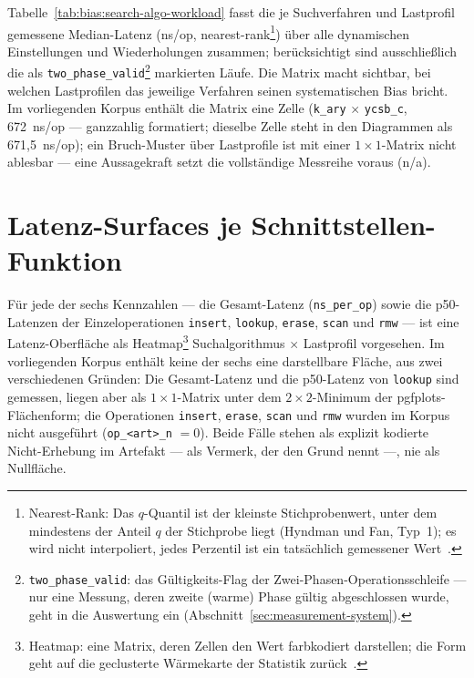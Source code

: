 Tabelle~\ref{tab:bias:search-algo-workload} fasst die je Suchverfahren und Lastprofil gemessene
Median-Latenz (ns/op, nearest-rank\footnote{Nearest-Rank: Das $q$-Quantil ist der kleinste
Stichprobenwert, unter dem mindestens der Anteil $q$ der Stichprobe liegt (Hyndman und Fan,
Typ~1); es wird nicht interpoliert, jedes Perzentil ist ein tatsächlich gemessener
Wert~\cite{hyndman1996quantiles}.}) über alle dynamischen Einstellungen und Wiederholungen
zusammen; berücksichtigt sind ausschließlich die als \texttt{two\_phase\_valid}\footnote{%
\texttt{two\_phase\_valid}: das Gültigkeits-Flag der Zwei-Phasen-Operationsschleife --- nur eine
Messung, deren zweite (warme) Phase gültig abgeschlossen wurde, geht in die Auswertung ein
(Abschnitt~\ref{sec:measurement-system}).} markierten Läufe. Die Matrix macht sichtbar, bei welchen
Lastprofilen das jeweilige Verfahren seinen systematischen Bias bricht. Im vorliegenden Korpus enthält
die Matrix eine Zelle (\texttt{k\_ary} $\times$ \texttt{ycsb\_c}, 672~ns/op --- ganzzahlig
formatiert; dieselbe Zelle steht in den Diagrammen als 671,5~ns/op); ein Bruch-Muster über
Lastprofile ist mit einer $1{\times}1$-Matrix nicht ablesbar --- eine Aussagekraft setzt die
vollständige Messreihe voraus (n/a).



\section{Latenz-Surfaces je Schnittstellen-Funktion}\label{sec:measurements:surfaces}

Für jede der sechs Kennzahlen --- die Gesamt-Latenz (\texttt{ns\_per\_op}) sowie die p50-Latenzen
der Einzeloperationen \texttt{insert}, \texttt{lookup}, \texttt{erase}, \texttt{scan} und
\texttt{rmw} --- ist eine Latenz-Oberfläche als Heatmap\footnote{Heatmap: eine Matrix, deren Zellen
den Wert farbkodiert darstellen; die Form geht auf die geclusterte Wärmekarte der Statistik
zurück~\cite{wilkinson2009heatmap}.} Suchalgorithmus $\times$ Lastprofil vorgesehen. Im vorliegenden
Korpus enthält keine der sechs eine darstellbare Fläche, aus zwei verschiedenen Gründen: Die
Gesamt-Latenz und die p50-Latenz von \texttt{lookup} sind gemessen, liegen aber als
$1{\times}1$-Matrix unter dem $2{\times}2$-Minimum der pgfplots-Flächenform; die Operationen
\texttt{insert}, \texttt{erase}, \texttt{scan} und \texttt{rmw} wurden im Korpus nicht ausgeführt
(\texttt{op\_<art>\_n} $= 0$). Beide Fälle stehen als explizit kodierte Nicht-Erhebung im Artefakt
--- als Vermerk, der den Grund nennt ---, nie als Nullfläche.

